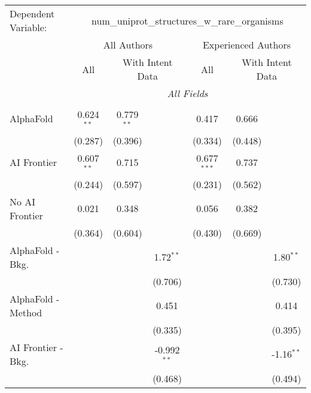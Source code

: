 \begingroup
\centering
\begin{tabular}{lcccccc}
   \tabularnewline \midrule \midrule
   Dependent Variable: & \multicolumn{6}{c}{num\_uniprot\_structures\_w\_rare\_organisms}\\
 & \multicolumn{3}{c}{All Authors} & \multicolumn{3}{c}{Experienced Authors} \\
\cmidrule(lr){2-4} \cmidrule(lr){5-7}
 & \multicolumn{1}{c}{All} & \multicolumn{2}{c}{With Intent Data} & \multicolumn{1}{c}{All} & \multicolumn{2}{c}{With Intent Data} \\
\cmidrule(lr){2-2} \cmidrule(lr){3-4} \cmidrule(lr){5-5} \cmidrule(lr){6-7}
 & \multicolumn{6}{c}{\textit{All Fields}} \\ \\
   AlphaFold               & 0.624$^{**}$ & 0.779$^{**}$ &               & 0.417         & 0.666   &   \\   
                           & (0.287)      & (0.396)      &               & (0.334)       & (0.448) &   \\   
   AI Frontier             & 0.607$^{**}$ & 0.715        &               & 0.677$^{***}$ & 0.737   &   \\   
                           & (0.244)      & (0.597)      &               & (0.231)       & (0.562) &   \\   
   No AI Frontier          & 0.021        & 0.348        &               & 0.056         & 0.382   &   \\   
                           & (0.364)      & (0.604)      &               & (0.430)       & (0.669) &   \\   
   AlphaFold - Bkg.        &              &              & 1.72$^{**}$   &               &         & 1.80$^{**}$\\   
                           &              &              & (0.706)       &               &         & (0.730)\\   
   AlphaFold - Method      &              &              & 0.451         &               &         & 0.414\\   
                           &              &              & (0.335)       &               &         & (0.395)\\   
   AI Frontier - Bkg.      &              &              & -0.992$^{**}$ &               &         & -1.16$^{**}$\\   
                           &              &              & (0.468)       &               &         & (0.494)\\   

\end{tabular}
